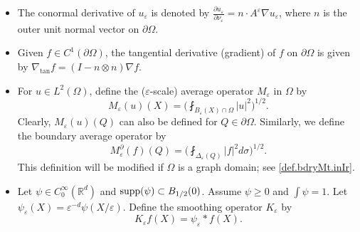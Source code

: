 \documentclass[reqno,12pt]{amsart} %
\theoremstyle{definition}
\theoremstyle{remark}
\numberwithin{equation}{section}
\newcommand{\R}{\mathbb{R}}
\newcommand{\e}{\varepsilon}
\DeclareMathOperator{\diam}{diam}
\begin{document}
\begin{itemize}
    \item The conormal derivative of $u_\e$ is denoted by $\frac{\partial u_\e}{\partial \nu_\e} = n\cdot A^\e \nabla u_\e$, where $n$ is the outer unit normal vector on $\partial \Omega$.

    \item Given $f \in C^1(\partial \Omega)$, the tangential derivative (gradient) of $f$ on $\partial \Omega$ is given by $\nabla_{\tan } f = (I - n\otimes n) \nabla f$.


    \item For $u \in L^2(\Omega)$, define the ($\e$-scale) average operator $M_\e$ in $\Omega$ by
    \begin{equation}
        M_\e(u)(X) = \bigg( \fint_{B_\e(X) \cap \Omega} |u|^2 \bigg)^{1/2}.
    \end{equation}
    Clearly, $M_\e(u)(Q)$ can also be defined for $Q \in \partial \Omega$. Similarly, we define the boundary average operator by
    \begin{equation}
        M_\e^{\partial}(f)(Q) = \bigg( \fint_{\Delta_\e(Q)} |f|^2 d\sigma \bigg)^{1/2}.
    \end{equation}
    This definition will be modified if $\Omega$ is a graph domain; see \eqref{def.bdryMt.inIr}.

    \item Let $\psi \in C_0^\infty(\R^d)$ and ${\rm supp}(\psi) \subset B_{1/2}(0)$. Assume $\psi \ge 0$ and $\int \psi = 1$. Let $\psi_\e(X) = \e^{-d} \psi(X/\e)$. Define the smoothing operator $K_\e$ by
    \begin{equation}\label{def.Ke}
        K_\e f(X) = \psi_\e * f(X).
    \end{equation}


\end{itemize}
\end{document}
